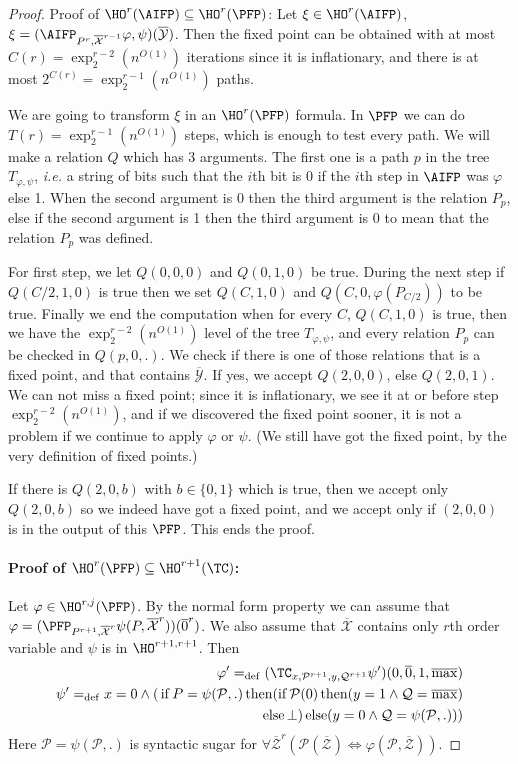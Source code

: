 \documentclass[a4paper,12pt]{article}
\theoremstyle{definition}
\renewcommand{\phi}{\varphi}
\newcommand{\hoa}[1]{\ensuremath{\HO^{#1}}}
\newcommand{\hod}[2]{\ensuremath{\HO^{#1,#2}}}
\newcommand{\ex}[1]{\ensuremath{\exp_{2}^{#1}(n^{O(1)})}}
\DeclareMathOperator{\ifte}{if}
\DeclareMathOperator{\thent}{then}
\DeclareMathOperator{\elset}{else}
\newcommand{\mc}{\mathcal}
\newcommand{\ol}{\overline}
\newcommand{\olmc}[1]{\overline{\mathcal{#1}}}
\newcommand{\ed}{=_{\mathrm{def}}}
\begin{document}
\begin{proof}Proof of $\hoa r(\AIFP)\subseteq\hoa {r}(\PFP)$: Let $\xi\in\hoa
  r(\AIFP)$, $\xi=(\AIFP_{P^{r},\olmc X^{r-1}}\phi,\psi)(\olmc Y)$.
  Then the fixed point can be obtained with at most $C(r)=\ex {r-2}$
  iterations since it is inflationary, and there is at most
  $2^{C(r)}=\ex{r-1}$ paths.

  We are going to transform $\xi$ in an $\hoa r(\PFP)$ formula.  In
  $\PFP$ we can do $T(r)=\ex {r-1}$ steps, which is enough to test
  every path. We will make a relation $Q$ which has 3 arguments. The
  first one is a path $p$ in the tree $T_{\phi,\psi}$, {\it i.e.} a
  string of bits such that the $i$th bit is 0 if the $i$th step in
  $\AIFP$ was $\phi$ else 1. When the second argument is 0 then the
  third argument is the relation $P_{p}$, else if the second argument
  is 1 then the third argument is 0 to mean that the relation $P_{p}$
  was defined.

  For first step, we let $Q(0,0,0)$ and $Q(0,1,0)$ be true. During the
  next step if $Q(C/2,1,0)$ is true then we set $Q(C,1,0)$ and
  $Q(C,0,\phi(P_{C/2}))$ to be  true. Finally we end the
  computation when for every $C$, $Q(C,1,0)$ is true, then we have
  the $\ex {r-2}$ level of the tree $T_{\phi,\psi}$, and every
  relation $P_{p}$ can be checked in $Q(p,0,.)$. We check if there is
  one of those relations that is a fixed point, and that contains $\olmc
  Y$. If yes, we accept $Q(2,0,0)$, else $Q(2,0,1)$. We can not miss a
  fixed point; since it is inflationary, we see it at or before step $\ex
  {r-2}$, and if we discovered the fixed point sooner, it is not a
  problem if we continue to apply $\phi$ or $\psi$. (We still have got
  the fixed point, by the very definition of fixed points.)

  If there is $Q(2,0,b)$ with $b\in\{0,1\}$ which is true, then we
  accept only $Q(2,0,b)$ so we indeed have got a fixed point, and we
  accept only if $(2,0,0)$ is in the output of this $\PFP$. This ends
  the proof.


\paragraph{Proof of  $\hoa {r}(\PFP)\subseteq\hoa {r+1}(\TC)$:}
Let $\phi\in\hod {r}j(\PFP)$. By the normal form property we can
assume that
$\phi=(\PFP_{P^{r+1},\olmc{X}^{r}}\psi(P,\olmc{X}^{r}))(\ol 0^{r})$. We
also assume that $\olmc X$ contains only $r$th order variable and
$\psi$ is in \hod {r+1}{r+1}. Then
\begin{eqnarray}\phi'\ed(\TC_{x,\mc{P}^{r+1},y,\mc{Q}^{r+1}}\psi')(0,\ol 0,1,\ol{\max})\\
  \psi'\ed x=0\land\mc (\ifte P=\psi(\mc P,.)\thent(\ifte \mc P(0)\thent (y=1\land \mc Q=\ol{\max})\nonumber\\
  \elset \bot)\elset (y=0\land \mc Q=\psi(\mc P,.)))
\end{eqnarray}
Here  $\mc P=\psi(\mc P,.)$ is syntactic sugar for $\forall \olmc Z^{r}
(\mc{P(\ol Z)\Leftrightarrow \phi(P,\ol Z)})$.


\end{proof}
\end{document}
